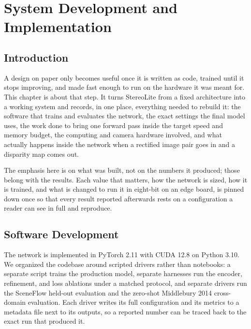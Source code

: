 \chapter{System Development and Implementation}
\label{ch:implementation}

\section{Introduction}
A design on paper only becomes useful once it is written as code,
trained until it stops improving, and made fast enough to run on the
hardware it was meant for. This chapter is about that step. It turns
StereoLite from a fixed architecture into a working system and records,
in one place, everything needed to rebuild it: the software that trains
and evaluates the network, the exact settings the final model uses, the
work done to bring one forward pass inside the target speed and memory
budget, the computing and camera hardware involved, and what actually
happens inside the network when a rectified image pair goes in and a
disparity map comes out.

The emphasis here is on what was built, not on the numbers it produced;
those belong with the results. Each value that matters, how the network
is sized, how it is trained, and what is changed to run it in eight-bit
on an edge board, is pinned down once so that every result reported
afterwards rests on a configuration a reader can see in full and
reproduce.

\FloatBarrier
\section{Software Development}
\label{sec:software_development}
The network is implemented in PyTorch 2.11 with CUDA 12.8 on Python
3.10. We organized the codebase around scripted drivers rather than
notebooks: a separate script trains the production model, separate
harnesses run the encoder, refinement, and loss ablations under a
matched protocol, and separate drivers run the SceneFlow held-out
evaluation and the zero-shot Middlebury 2014 cross-domain evaluation.
Each driver writes its full configuration and its metrics to a metadata
file next to its outputs, so a reported number can be traced back to
the exact run that produced it.

